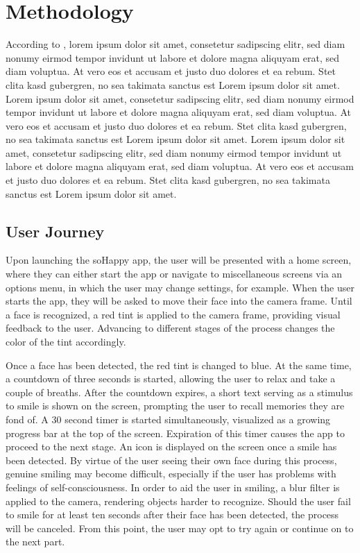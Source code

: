 \section{Methodology} \label{sec:methodology}
According to \cite{sample_ref}, lorem ipsum dolor sit amet, consetetur sadipscing elitr, sed diam nonumy eirmod tempor invidunt ut labore et dolore magna aliquyam erat, sed diam voluptua. At vero eos et accusam et justo duo dolores et ea rebum. Stet clita kasd gubergren, no sea takimata sanctus est Lorem ipsum dolor sit amet. Lorem ipsum dolor sit amet, consetetur sadipscing elitr, sed diam nonumy eirmod tempor invidunt ut labore et dolore magna aliquyam erat, sed diam voluptua. At vero eos et accusam et justo duo dolores et ea rebum. Stet clita kasd gubergren, no sea takimata sanctus est Lorem ipsum dolor sit amet. Lorem ipsum dolor sit amet, consetetur sadipscing elitr, sed diam nonumy eirmod tempor invidunt ut labore et dolore magna aliquyam erat, sed diam voluptua. At vero eos et accusam et justo duo dolores et ea rebum. Stet clita kasd gubergren, no sea takimata sanctus est Lorem ipsum dolor sit amet.

\subsection{User Journey} \label{sec:user_journey}
Upon launching the soHappy app, the user will be presented with a home screen, where they can either start the app or navigate to miscellaneous screens via an options menu, in which the user may change settings, for example.
When the user starts the app, they will be asked to move their face into the camera frame. Until a face is recognized, a red tint is applied to the camera frame, providing visual feedback to the user. Advancing to different stages of the process changes the color of the tint accordingly.

Once a face has been detected, the red tint is changed to blue. At the same time, a countdown of three seconds is started, allowing the user to relax and take a couple of breaths.
After the countdown expires, a short text serving as a stimulus to smile is shown on the screen, prompting the user to recall memories they are fond of. A 30 second timer is started simultaneously, visualized as a growing progress bar at the top of the screen. Expiration of this timer causes the app to proceed to the next stage. An icon is displayed on the screen once a smile has been detected.
By virtue of the user seeing their own face during this process, genuine smiling may become difficult, especially if the user has problems with feelings of self-consciousness. In order to aid the user in smiling, a blur filter is applied to the camera, rendering objects harder to recognize.
Should the user fail to smile for at least ten seconds after their face has been detected, the process will be canceled. From this point, the user may opt to try again or continue on to the next part.

